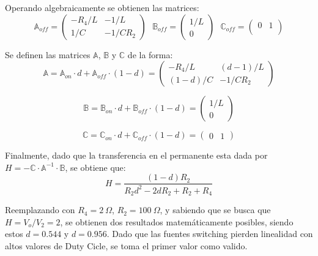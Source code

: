 Operando algebraicamente se obtienen las matrices: 
\begin{equation*}
\mathbb{A}_{off} =  \begin{pmatrix}
	-R_4/L & -1/L \\
	1/C & -1/ C R_2
\end{pmatrix} \ \ \
\mathbb{B}_{off} =  \begin{pmatrix}
	1/L \\
	0
\end{pmatrix} \ \ \
\mathbb{C}_{off} =  \begin{pmatrix}
	0 & 1 \\
\end{pmatrix}
\end{equation*}

Se definen las matrices $\mathbb{A}$, $\mathbb{B}$ y $\mathbb{C}$ de la forma:
\begin{equation*}
\mathbb{A} = \mathbb{A}_{on} \cdot d + \mathbb{A}_{off} \cdot (1-d) =  \begin{pmatrix}
	-R_4/L & (d-1)/L \\
	(1-d)/C & -1/ C R_2
\end{pmatrix}
\end{equation*}

\begin{equation*}
\mathbb{B} = \mathbb{B}_{on} \cdot d + \mathbb{B}_{off} \cdot (1-d) = \begin{pmatrix}
	1/L \\
	0
\end{pmatrix}
\end{equation*}

\begin{equation*}
\mathbb{C} = \mathbb{C}_{on} \cdot d + \mathbb{C}_{off} \cdot (1-d) = \begin{pmatrix}
	0 & 1
\end{pmatrix}
\end{equation*}

Finalmente, dado que la transferencia en el permanente esta dada por $H = -\mathbb{C} \cdot \mathbb{A}^{-1} \cdot \mathbb{B}$, se obtiene que:
\begin{equation*}
H = \frac{\left( 1 - d \right) R_2}{R_2 d^2 - 2 d R_2 + R_2 + R_4}
\end{equation*}

Reemplazando con $R_4 = 2 \ \Omega$, $R_2 = 100 \ \Omega$, y sabiendo que se busca que $H = V_o / V_2 = 2$, se obtienen dos resultados matemáticamente posibles, siendo estos $d = 0.544$ y $d = 0.956$. Dado que las fuentes switching pierden linealidad con altos valores de Duty Cicle, se toma el primer valor como valido.

